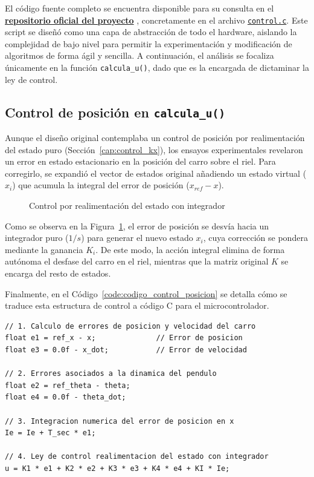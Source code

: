 \documentclass[11pt,fleqn]{book} %
\begin{document}
El código fuente completo se encuentra disponible para su consulta en el \href{https://github.com/MPV247/TFG_Control_MiguelPorcar}{\textbf{repositorio oficial del proyecto}} \cite{Porcar2026TFG}, concretamente en el archivo \href{https://github.com/MPV247/TFG_Control_MiguelPorcar/blob/main/firmware_C2000/f280049c_ws/control/src/control.c}{\texttt{control.c}}. Este script se diseñó como una capa de abstracción de todo el hardware, aislando la complejidad de bajo nivel para permitir la experimentación y modificación de algoritmos de forma ágil y sencilla. A continuación, el análisis se focaliza únicamente en la función \texttt{calcula\_u()}, dado que es la encargada de dictaminar la ley de control.

\newpage

\subsection{Control de posición en \texttt{calcula\_u()}}
 \label{cap:con_integral}
 Aunque el diseño original contemplaba un control de posición por realimentación del estado puro (Sección~\ref{cap:control_kx}), los ensayos experimentales revelaron un error en estado estacionario en la posición del carro sobre el riel. Para corregirlo, se expandió el vector de estados original añadiendo un estado virtual ($x_i$) que acumula la integral del error de posición ($x_{ref} - x$). 

\begin{figure}[!htbp]
	\centering
	\resizebox{\textwidth}{!}{%
		
	}
	\caption{Control por realimentación del estado con integrador}
	\label{fig:control_integral}
\end{figure}

Como se observa en la Figura~\ref{fig:control_integral}, el error de posición se desvía hacia un integrador puro ($1/s$) para generar el nuevo estado $x_i$, cuya corrección se pondera mediante la ganancia $K_i$. De este modo, la acción integral elimina de forma autónoma el desfase del carro en el riel, mientras que la matriz original $K$ se encarga del resto de estados. 

Finalmente, en el Código~\ref{code:codigo_control_posicion} se detalla cómo se traduce esta estructura de control a código C para el microcontrolador. 

\begin{lstlisting}[style=estiloC, caption={Código para el control de posición con término integral}, label={code:codigo_control_posicion}]
// 1. Calculo de errores de posicion y velocidad del carro
float e1 = ref_x - x;              // Error de posicion
float e3 = 0.0f - x_dot;           // Error de velocidad 
	
// 2. Errores asociados a la dinamica del pendulo
float e2 = ref_theta - theta;      
float e4 = 0.0f - theta_dot;       
	
// 3. Integracion numerica del error de posicion en x
Ie = Ie + T_sec * e1;
	
// 4. Ley de control realimentacion del estado con integrador
u = K1 * e1 + K2 * e2 + K3 * e3 + K4 * e4 + KI * Ie;
\end{lstlisting}
\newpage
\end{document}
